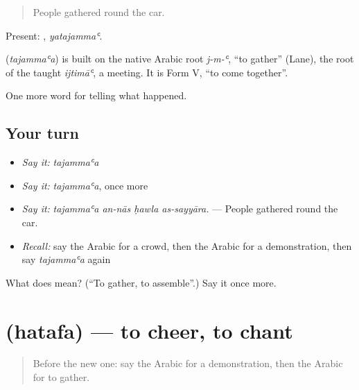 \begin{quote}
People gathered round the car.
\end{quote}

Present: , \emph{yatajammaʿ}.

\begin{cousinweb}
\textbf{} (\emph{tajammaʿa}) is built on the native Arabic root \emph{j-m-ʿ}, \textquotedblleft{}to gather\textquotedblright{} (Lane), the root of the taught \emph{ijtimāʿ}, a meeting. It is Form V, \textquotedblleft{}to come together\textquotedblright{}.
\end{cousinweb}

\begin{grammarlens}[title={What you've built}]
One more word for telling what happened.
\end{grammarlens}

\subsection*{Your turn}
\begin{itemize}
\raggedright
  \item \emph{Say it:} \emph{tajammaʿa}
  \item \emph{Say it:} \emph{tajammaʿa}, once more
  \item \emph{Say it:} \emph{tajammaʿa an-nās ḥawla as-sayyāra.} — People gathered round the car.
  \item \emph{Recall:} say the Arabic for a crowd, then the Arabic for a demonstration, then say \emph{tajammaʿa} again
\end{itemize}

\begin{tcolorbox}[breakable,colback=teal!4,colframe=teal!35!black,title={Before you move on}]
What does  mean? (\textquotedblleft{}To gather, to assemble\textquotedblright{}.) Say it once more.
\end{tcolorbox}
\section[\texorpdfstring{\ar{هتف} (hatafa)}{هتف (hatafa)}]{ (hatafa) — to cheer, to chant}

\label{lesson:AR-C353-hatafa}



\begin{quote}
Before the new one: say the Arabic for a demonstration, then the Arabic for to gather.
\end{quote}

